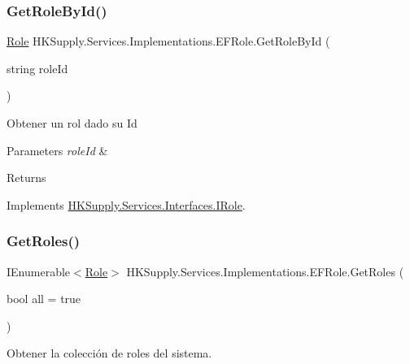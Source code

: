\subsubsection{\texorpdfstring{Get\+Role\+By\+Id()}{GetRoleById()}}
{\footnotesize\ttfamily \hyperlink{class_h_k_supply_1_1_models_1_1_role}{Role} H\+K\+Supply.\+Services.\+Implementations.\+E\+F\+Role.\+Get\+Role\+By\+Id (\begin{DoxyParamCaption}\item[{string}]{role\+Id }\end{DoxyParamCaption})}



Obtener un rol dado su Id 


\begin{DoxyParams}{Parameters}
{\em role\+Id} & \\
\hline
\end{DoxyParams}
\begin{DoxyReturn}{Returns}

\end{DoxyReturn}


Implements \hyperlink{interface_h_k_supply_1_1_services_1_1_interfaces_1_1_i_role}{H\+K\+Supply.\+Services.\+Interfaces.\+I\+Role}.

\mbox{\label{class_h_k_supply_1_1_services_1_1_implementations_1_1_e_f_role_a7fd2f7f9bae498128f23ad0659e3ec4a}} 
\subsubsection{\texorpdfstring{Get\+Roles()}{GetRoles()}}
{\footnotesize\ttfamily I\+Enumerable$<$\hyperlink{class_h_k_supply_1_1_models_1_1_role}{Role}$>$ H\+K\+Supply.\+Services.\+Implementations.\+E\+F\+Role.\+Get\+Roles (\begin{DoxyParamCaption}\item[{bool}]{all = {\ttfamily true} }\end{DoxyParamCaption})}



Obtener la colección de roles del sistema. 


